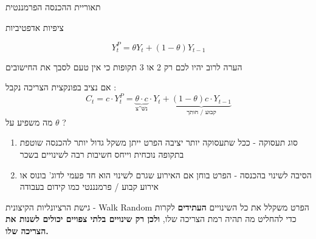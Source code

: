\documentclass[usenames,dvipsnames]{beamer}
\begin{document}
\begin{RTL}
\begin{frame}[allowframebreaks]{תאוריית ההכנסה הפרמננטית}
\begin{block}{ציפיות אדפטיביות}
    \end{block}
    \[
            Y^P_t = \theta Y_t  +  (1-\theta)Y_{t-1}
            \]
           
                \begin{alertblock}{הערה}
                    לרוב יהיו לכם רק 2 או 3 תקופות כי אין טעם לסבך את החישובים
                \end{alertblock}
    אם נציב בפונקצית הצריכה נקבל : 
    \begin{equation*}
        C_t = c\cdot Y^P_t = \underbrace{\theta\cdot c}_{\text{נש''צ}}\cdot Y_t  + \underbrace{ (1-\theta)c\cdot Y_{t-1}}_{\text{קבוע / חותך}}
    \end{equation*}
    \framebreak
    מה משפיע על $\theta$ ?
    \begin{enumerate}
        \item סוג תעסוקה - ככל שתעסוקה יותר יציבה הפרט ייתן משקל גדול יותר להכנסה שוטפת בתקופה נוכחית וייחס חשיבות רבה לשינויים בשכר
        \item הסיבה לשינוי בהכנסה - הפרט בוחן אם האירוע שגרם לשינוי הוא חד פעמי לדוג' בונוס או אירוע קבוע / פרמנננטי כמו קידום בעבודה
    \end{enumerate}

    \framebreak
    \begin{block}{גישת הרציונליות הקיצונית - Walk Random}
        הפרט משקלל את כל השינויים \textbf{העתידים} לקרות כדי להחליט מה תהיה רמת הצריכה שלו, \textbf{ולכן רק שינויים בלתי צפויים יכולים לשנות את הצריכה שלו.}


        
    \end{block}
\end{frame}


\end{RTL}
\end{document}
